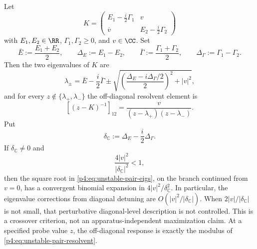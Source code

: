 \documentclass[12pt,a4paper]{article}
\begin{document}
\begin{theorem}
\label{p4:thm:unstable-pair-resonance}
Let
\begin{equation}
\label{p4:eq:unstable-pair-matrix}
K=
\begin{pmatrix}
E_1-\frac{i}{2}\Gamma_1 & v\\
\overline v & E_2-\frac{i}{2}\Gamma_2
\end{pmatrix}
\end{equation}
with $E_1,E_2\in\RR$, $\Gamma_1,\Gamma_2\ge0$, and $v\in\CC$.
Set
\[
\bar E:=\frac{E_1+E_2}{2},
\qquad
\Delta_E:=E_1-E_2,
\qquad
\bar\Gamma:=\frac{\Gamma_1+\Gamma_2}{2},
\qquad
\Delta_\Gamma:=\Gamma_1-\Gamma_2.
\]
Then the two eigenvalues of $K$ are
\begin{equation}
\label{p4:eq:unstable-pair-eigs}
\lambda_\pm
=
\bar E-\frac{i}{2}\bar\Gamma
\pm
\sqrt{\left(\frac{\Delta_E-i\Delta_\Gamma/2}{2}\right)^2+|v|^2},
\end{equation}
and for every $z\notin\{\lambda_+,\lambda_-\}$ the off-diagonal resolvent element is
\begin{equation}
\label{p4:eq:unstable-pair-resolvent}
[(z-K)^{-1}]_{12}
=
\frac{v}{(z-\lambda_+)(z-\lambda_-)}.
\end{equation}
Put
\begin{equation}
\label{p4:eq:unstable-pair-complex-splitting}
\delta_{\mathbb C}:=\Delta_E-\frac{i}{2}\Delta_\Gamma .
\end{equation}
If \(\delta_{\mathbb C}\ne0\) and
\begin{equation}
\label{p4:eq:unstable-pair-perturbative-domain}
\frac{4|v|^2}{|\delta_{\mathbb C}|^2}<1,
\end{equation}
then the square root in \eqref{p4:eq:unstable-pair-eigs}, on the branch
continued from \(v=0\), has a convergent binomial expansion in
\(4|v|^2/\delta_{\mathbb C}^2\).  In particular, the eigenvalue corrections
from diagonal detuning are \(O(|v|^2/|\delta_{\mathbb C}|)\).  When
\(2|v|/|\delta_{\mathbb C}|\) is not small, that perturbative diagonal-level
description is not controlled.  This is a crossover criterion, not an
apparatus-independent maximization claim.  At a specified probe value \(z\),
the off-diagonal response is exactly the modulus of
\eqref{p4:eq:unstable-pair-resolvent}.
\end{theorem}
\end{document}
